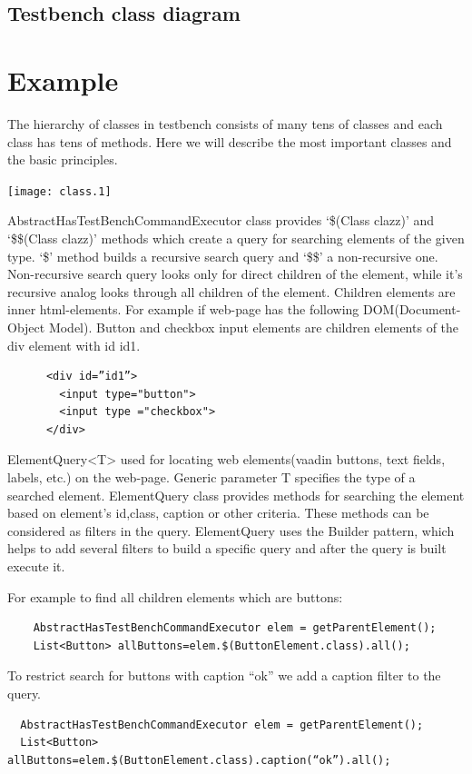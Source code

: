 \documentclass{article}
\begin{document}
  \subsection{Testbench class diagram}
  
  \section{Example}

  
  The hierarchy of classes in testbench consists of many tens of classes and each class has tens of methods.
  Here we will describe the most important classes and the basic principles.

    \texttt{[image: class.1]}
    
AbstractHasTestBenchCommandExecutor class provides  `\$(Class clazz)' and
`\$\$(Class clazz)' methods which create a query for searching elements of
the given type.
 `\$' method builds a recursive search query and `\$\$' a non-recursive one.
 Non-recursive search query looks only for direct children of the element, while it’s recursive analog looks
  through all children of the element. Children elements are inner html-elements.
   For example if web-page has the following DOM(Document-Object Model). 
   Button and checkbox input elements are children elements of the div element with id id1.
  \lstset{language=HTML}
    \begin{lstlisting}
      <div id=”id1”>
        <input type="button">
        <input type ="checkbox">
      </div>
  \end{lstlisting}
  
  
ElementQuery<T> used for locating web elements(vaadin buttons, text fields, labels, etc.) on the web-page.
 Generic parameter T specifies the type of a searched element. 
 ElementQuery class provides methods for searching the element based on element’s id,class,
  caption or other criteria. These methods can be considered as filters in the query.
   ElementQuery uses the Builder pattern, which helps to add several filters to build a specific query and after
    the query is built execute it.

For example to find all children elements which are buttons:
  \lstset{language=Java}
    \begin{lstlisting}
    AbstractHasTestBenchCommandExecutor elem = getParentElement();
    List<Button> allButtons=elem.$(ButtonElement.class).all();
  \end{lstlisting}
  
To restrict search for buttons with caption “ok” we add a caption filter to the query.
  \lstset{language=Java}
  \begin{lstlisting}
  AbstractHasTestBenchCommandExecutor elem = getParentElement();
  List<Button> allButtons=elem.$(ButtonElement.class).caption(“ok”).all();
  \end{lstlisting}
  
\end{document}
